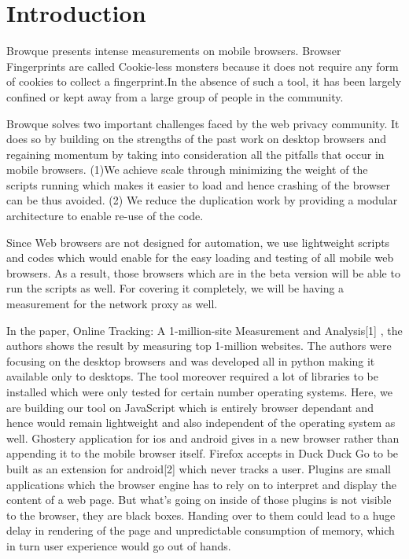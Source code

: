 \documentclass[journal]{IEEEtran}
\begin{document}
\section{Introduction}
Browque presents intense measurements on mobile browsers. 
Browser Fingerprints are called Cookie-less monsters because it does not require
any form of cookies to collect a fingerprint.In the absence of such a tool, it
has been largely confined or kept away from a large group of people in the
community. 


Browque solves two important challenges faced by the web privacy community. It
does so by building on the strengths of the past work on desktop browsers and
regaining momentum by taking into consideration all the pitfalls that occur in
mobile browsers. (1)We achieve scale through minimizing the weight of the
scripts running which makes it easier to load and hence crashing of the browser
can be thus avoided. (2) We reduce the duplication work by providing a modular
architecture to enable re-use of the code. 


Since Web browsers are not designed for automation, we use lightweight scripts
and codes which would enable for the easy loading and testing of all mobile web
browsers. As a result, those browsers which are in the beta version will be able
to run the scripts as well. For covering it completely, we will be having a
measurement for the network proxy as well.


In the paper, Online Tracking: A 1-million-site Measurement and Analysis[1] , the
authors shows the result by measuring top 1-million websites. The authors were
focusing on the desktop browsers and was developed all in python making it
available only to desktops. The tool moreover required a lot of libraries to be
installed which were only tested for certain number operating systems. Here, we
are building our tool on JavaScript which is entirely browser dependant and
hence would remain lightweight and also independent of the operating system as
well. Ghostery application for ios and android gives in a new browser rather
than appending it to the mobile browser itself.  Firefox accepts in Duck Duck Go
to be built as an extension for android[2] which never tracks a user. Plugins
are small applications which the browser engine has to rely on to interpret and
display the content of a web page. But what's going on inside of those plugins
is not visible to the browser, they are black boxes. Handing over to them could
lead to a huge delay in rendering of the page and unpredictable consumption of
memory, which in turn user experience would go out of hands. 
\end{document}
